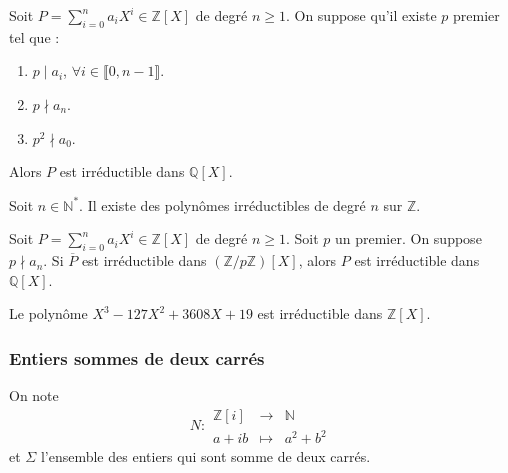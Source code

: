   \begin{theorem}
    Soit $P = \sum_{i=0}^n a_i X^i \in \mathbb{Z}[X]$ de degré $n \geq 1$. On suppose qu'il existe $p$ premier tel que :
    \begin{enumerate}[label={\bfseries(\roman*)}]
      \item $p \mid a_i$, $\forall i \in \llbracket 0, n-1 \rrbracket$.
      \item $p \nmid a_n$.
      \item $p^2 \nmid a_0$.
    \end{enumerate}
    Alors $P$ est irréductible dans $\mathbb{Q}[X]$.
  \end{theorem}


  \begin{application}
    Soit $n \in \mathbb{N}^*$. Il existe des polynômes irréductibles de degré $n$ sur $\mathbb{Z}$.
  \end{application}


  \begin{theorem}
    Soit $P = \sum_{i=0}^n a_i X^i \in \mathbb{Z}[X]$ de degré $n \geq 1$. Soit $p$ un premier. On suppose $p \nmid a_n$.
    \newpar
    Si $\overline{P}$ est irréductible dans $(\mathbb{Z}/p\mathbb{Z})[X]$, alors $P$ est irréductible dans $\mathbb{Q}[X]$.
  \end{theorem}

  \begin{example}
    Le polynôme $X^3-127X^2+3608X+19$ est irréductible dans $\mathbb{Z}[X]$.
  \end{example}

  \subsubsection{Entiers sommes de deux carrés}


  \begin{notation}
    On note \[ N :
    \begin{array}{ccc}
      \mathbb{Z}[i] &\rightarrow& \mathbb{N} \\
      a+ib &\mapsto& a^2 + b^2
    \end{array}
    \] et $\Sigma$ l'ensemble des entiers qui sont somme de deux carrés.
  \end{notation}

